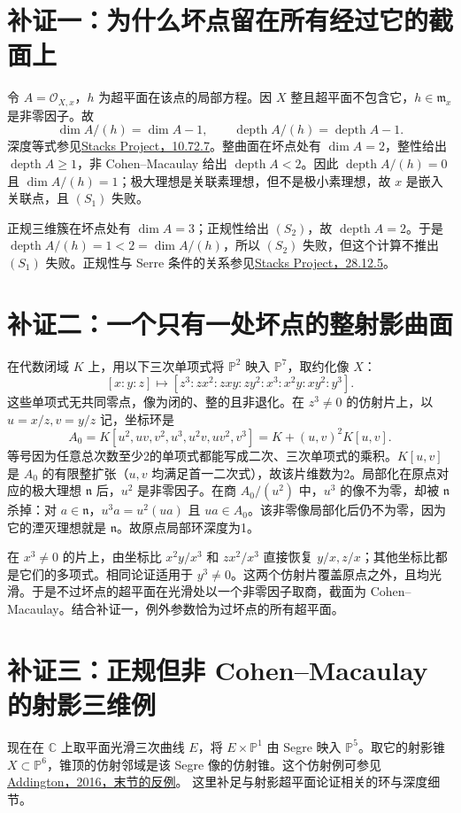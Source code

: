 \documentclass[openany,fontset=fandol]{ctexbook}
\DeclareMathOperator{\depth}{depth}
\begin{document}
\newpage
\section*{补证一：为什么坏点留在所有经过它的截面上}
令 $A=\mathcal O_{X,x}$，$h$ 为超平面在该点的局部方程。因 $X$ 整且超平面不包含它，$h\in\mathfrak m_x$ 是非零因子。故
\[
 \dim A/(h)=\dim A-1,\qquad
 \depth A/(h)=\depth A-1.
\]
深度等式参见\href{https://stacks.math.columbia.edu/tag/00LE}{Stacks Project，10.72.7}。整曲面在坏点处有 $\dim A=2$，整性给出 $\depth A\ge1$，非 Cohen--Macaulay 给出 $\depth A<2$。因此 $\depth A/(h)=0$ 且 $\dim A/(h)=1$；极大理想是关联素理想，但不是极小素理想，故 $x$ 是嵌入关联点，且 $(S_1)$ 失败。

正规三维簇在坏点处有 $\dim A=3$；正规性给出 $(S_2)$，故 $\depth A=2$。于是 $\depth A/(h)=1<2=\dim A/(h)$，所以 $(S_2)$ 失败，但这个计算不推出 $(S_1)$ 失败。正规性与 Serre 条件的关系参见\href{https://stacks.math.columbia.edu/tag/033P}{Stacks Project，28.12.5}。

\section*{补证二：一个只有一处坏点的整射影曲面}
在代数闭域 $K$ 上，用以下三次单项式将 $\mathbb P^2$ 映入 $\mathbb P^7$，取约化像 $X$：
\[
 [x:y:z]\longmapsto
 [z^3:zx^2:zxy:zy^2:x^3:x^2y:xy^2:y^3].
\]
这些单项式无共同零点，像为闭的、整的且非退化。在 $z^3\ne0$ 的仿射片上，以 $u=x/z,v=y/z$ 记，坐标环是
\[
 A_0=K[u^2,uv,v^2,u^3,u^2v,uv^2,v^3]
       =K+(u,v)^2K[u,v].
\]
等号因为任意总次数至少2的单项式都能写成二次、三次单项式的乘积。$K[u,v]$ 是 $A_0$ 的有限整扩张（$u,v$ 均满足首一二次式），故该片维数为2。局部化在原点对应的极大理想 $\mathfrak n$ 后，$u^2$ 是非零因子。在商 $A_0/(u^2)$ 中，$u^3$ 的像不为零，却被 $\mathfrak n$ 杀掉：对 $a\in\mathfrak n$，$u^3a=u^2(ua)$ 且 $ua\in A_0$。该非零像局部化后仍不为零，因为它的湮灭理想就是 $\mathfrak n$。故原点局部环深度为1。

在 $x^3\ne0$ 的片上，由坐标比 $x^2y/x^3$ 和 $zx^2/x^3$ 直接恢复 $y/x,z/x$；其他坐标比都是它们的多项式。相同论证适用于 $y^3\ne0$。这两个仿射片覆盖原点之外，且均光滑。于是不过坏点的超平面在光滑处以一个非零因子取商，截面为 Cohen--Macaulay。结合补证一，例外参数恰为过坏点的所有超平面。

\newpage
\section*{补证三：正规但非 Cohen--Macaulay 的射影三维例}
现在在 $\mathbb C$ 上取平面光滑三次曲线 $E$，将 $E\times\mathbb P^1$ 由 Segre 映入 $\mathbb P^5$。取它的射影锥 $X\subset\mathbb P^6$，锥顶的仿射邻域是该 Segre 像的仿射锥。这个仿射例可参见
\href{https://content.algebraicgeometry.nl/2016-2/2016-2-011.pdf}{Addington，2016，末节的反例}。
这里补足与射影超平面论证相关的环与深度细节。
\end{document}
